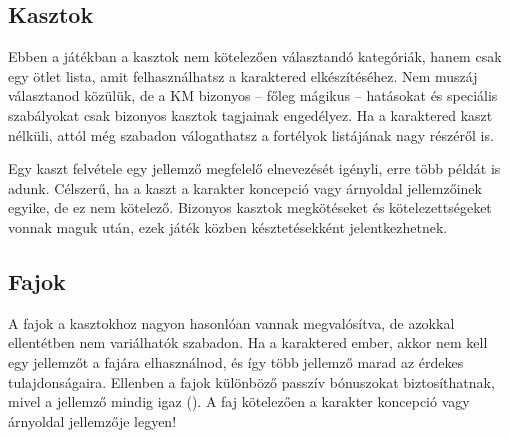 \subsection{Kasztok}

Ebben a játékban a kasztok nem kötelezően választandó kategóriák, hanem csak egy ötlet lista, amit felhasználhatsz a karaktered elkészítéséhez. Nem muszáj választanod közülük, de a KM bizonyos -- főleg mágikus -- hatásokat és speciális szabályokat csak bizonyos kasztok tagjainak engedélyez. Ha a karaktered kaszt nélküli, attól még szabadon válogathatsz a fortélyok listájának nagy részéről is.

Egy kaszt felvétele egy jellemző megfelelő elnevezését igényli, erre több példát is adunk. Célszerű, ha a kaszt a karakter koncepció vagy árnyoldal jellemzőinek egyike, de ez nem kötelező. Bizonyos kasztok megkötéseket és kötelezettségeket vonnak maguk után, ezek játék közben késztetésekként jelentkezhetnek.

\subsection{Fajok}

A fajok a kasztokhoz nagyon hasonlóan vannak megvalósítva, de azokkal ellentétben nem variálhatók szabadon. Ha a karaktered ember, akkor nem kell egy jellemzőt a fajára elhasználnod, és így több jellemző marad az érdekes tulajdonságaira. Ellenben a fajok különböző passzív bónuszokat biztosíthatnak, mivel a jellemző mindig igaz (). A faj kötelezően a karakter koncepció vagy árnyoldal jellemzője legyen!
